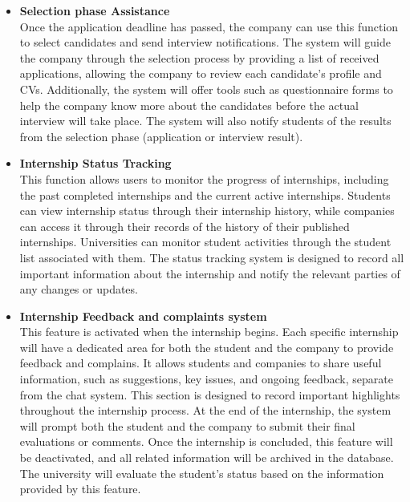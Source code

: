\begin{itemize}[label={ }]
    \item \textcolor{bluepoli}{\textbf{Selection phase Assistance}}
    \\Once the application deadline has passed, the company can use this function to select candidates and send interview notifications. The system will 
    guide the company through the selection process by providing a list of received applications, allowing the company to review each candidate's profile 
    and CVs. Additionally, the system will offer tools such as questionnaire forms to help the company know more about the candidates before the actual 
    interview will take place. The system will also notify students of the results from the selection phase (application or interview result).

    \item \textcolor{bluepoli}{\textbf{Internship Status Tracking}}
    \\This function allows users to monitor the progress of internships, including the past completed internships and the current active internships.
    Students can view internship status through their internship history, while companies can access it through their records of the history of their 
    published internships. Universities can monitor student activities through the student list associated with them. The status tracking system
    is designed to record all important information about the internship and notify the relevant parties of any changes or updates.

    \item \textcolor{bluepoli}{\textbf{Internship Feedback and complaints system}}
    \\This feature is activated when the internship begins. Each specific internship will have a dedicated area for both the student and the company to
    provide feedback and complains.
    It allows students and companies to share useful information, such as suggestions, key issues, and ongoing feedback, separate from the chat system. 
    This section is designed to record important highlights throughout the internship process. At the end of the internship, the system will prompt both 
    the student and the company to submit their final evaluations or comments. Once the internship is concluded, this feature will be deactivated, and 
    all related information will be archived in the database. The university will evaluate the student's status based on the information provided by this
    feature.


\end{itemize}
